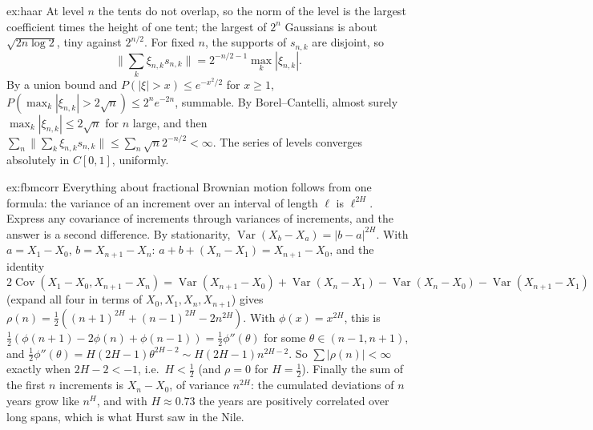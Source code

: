 \begin{solution}{ex:haar}
\idea At level $n$ the tents do not overlap, so the norm of the level is the largest coefficient times the height of one tent; the largest of $2^n$ Gaussians is about $\sqrt{2n\log2}$, tiny against $2^{n/2}$.
\writeup For fixed $n$, the supports of $s_{n,k}$ are disjoint, so
\[
\|\sum_k\xi_{n,k}s_{n,k}\|=2^{-n/2-1}\max_k|\xi_{n,k}|.
\]
By a union bound and $P(|\xi|>x)\le e^{-x^2/2}$ for $x\ge1$,
$P(\max_k|\xi_{n,k}|>2\sqrt n)\le2^ne^{-2n}$, summable. By Borel--Cantelli, almost surely $\max_k|\xi_{n,k}|\le2\sqrt n$ for $n$ large, and then $\sum_n\|\sum_k\xi_{n,k}s_{n,k}\|\le\sum_n\sqrt n2^{-n/2}<\infty$. The series of levels
converges absolutely in $C[0,1]$, uniformly.
\end{solution}

\begin{solution}{ex:fbmcorr}
\idea Everything about fractional Brownian motion follows from one formula: the variance of an increment over an interval of length $\ell$ is $\ell^{2H}$. Express any covariance of increments through variances of
increments, and the answer is a second difference.
\writeup By stationarity, $\operatorname{Var}(X_b-X_a)=|b-a|^{2H}$. With $a=X_1-X_0$, $b=X_{n+1}-X_n$: $a+b+(X_n-X_1)=X_{n+1}-X_0$, and the identity
$2\operatorname{Cov}(X_1-X_0,X_{n+1}-X_n)=\operatorname{Var}(X_{n+1}-X_0)+\operatorname{Var}(X_n-X_1)-\operatorname{Var}(X_{n}-X_0)-\operatorname{Var}(X_{n+1}-X_1)$ (expand all four in terms of $X_0,X_1,X_n,X_{n+1}$)
gives $\rho(n)=\frac12((n+1)^{2H}+(n-1)^{2H}-2n^{2H})$. With $\phi(x)=x^{2H}$, this is $\frac12(\phi(n+1)-2\phi(n)+\phi(n-1))=\frac12\phi''(\theta)$ for some $\theta\in(n-1,n+1)$, and
$\frac12\phi''(\theta)=H(2H-1)\theta^{2H-2}\sim H(2H-1)n^{2H-2}$. So $\sum|\rho(n)|<\infty$ exactly when $2H-2<-1$, i.e.\ $H<\frac12$ (and $\rho=0$ for $H=\frac12$). Finally the sum of the first $n$ increments is $X_n-X_0$,
of variance $n^{2H}$: the cumulated deviations of $n$ years grow like $n^H$, and with $H\approx0.73$ the years are positively correlated over long spans, which is what Hurst saw in the Nile.
\end{solution}

